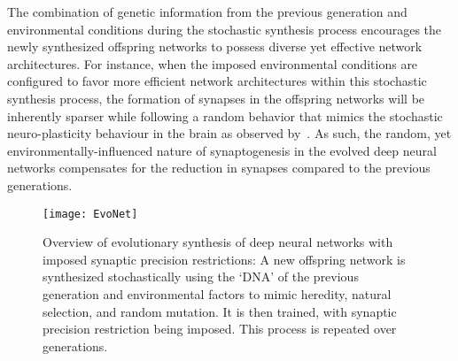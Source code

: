 \documentclass[10pt,letterpaper]{article}
\begin{document}
The combination of genetic information from the previous generation and environmental conditions during the stochastic synthesis process encourages the newly synthesized offspring networks to possess diverse yet effective network architectures. For instance, when the imposed environmental conditions are configured to favor more efficient network architectures within this stochastic synthesis process, the formation of synapses in the offspring networks will be inherently sparser while following a random behavior that mimics the stochastic neuro-plasticity behaviour in the brain as observed by~.  As such, the random, yet environmentally-influenced nature of synaptogenesis in the evolved deep neural networks compensates for the reduction in synapses compared to the previous generations.
\begin{figure}[!th]
	\vspace{-0.25 cm}
	\begin{center}
		\texttt{[image: EvoNet]}
	\end{center}
	\vspace{-0.45 cm}
	\caption{Overview of evolutionary synthesis of deep neural networks with imposed synaptic precision restrictions: A new offspring network is synthesized stochastically using the `DNA' of the previous generation and environmental factors to mimic heredity, natural selection, and random mutation.  It is then trained, with synaptic precision restriction being imposed.  This process is repeated over generations.}
	\label{fig:flowdiagram}
	\vspace{-0.15 cm}
\end{figure}
\end{document}
